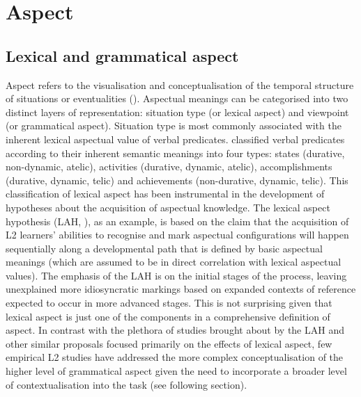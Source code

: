 \documentclass[output=paper,modfonts,nonflat,newtxmath]{langsci/langscibook}
\begin{document}
\section{Aspect} %
\label{sec:salaberry:1}

\subsection{Lexical and grammatical aspect}
\label{sec:salaberry:1.1}

Aspect refers to the visualisation and conceptualisation of the temporal structure of situations or eventualities (\citealt{Comrie1976, Dahl1985, Smith1997}). Aspectual meanings can be categorised into two distinct layers of representation: situation type (or lexical aspect) and viewpoint (or grammatical aspect). Situation type is most commonly associated with the inherent lexical aspectual value of verbal predicates. \citet{Vendler1967} classified verbal predicates according to their inherent semantic meanings into four types: states (durative, non-dynamic, atelic), activities (durative, dynamic, atelic), accomplishments (durative, dynamic, telic) and achievements (non-durative, dynamic, telic). This classification of lexical aspect has been instrumental in the development of hypotheses about the acquisition of aspectual knowledge. The lexical aspect hypothesis (LAH, \citealt{Andersen1991}), as an example, is based on the claim that the acquisition of L2 learners’ abilities to recognise and mark aspectual configurations will happen sequentially along a developmental path that is defined by basic aspectual meanings (which are assumed to be in direct correlation with lexical aspectual values). The emphasis of the LAH is on the initial stages of the process, leaving unexplained more idiosyncratic markings based on expanded contexts of reference expected to occur in more advanced stages. This is not surprising given that lexical aspect is just one of the components in a comprehensive definition of aspect. In contrast with the plethora of studies brought about by the LAH and other similar proposals focused primarily on the effects of lexical aspect, few empirical L2 studies have addressed the more complex conceptualisation of the higher level of grammatical aspect given the need to incorporate a broader level of contextualisation into the task (see following section).
\end{document}
